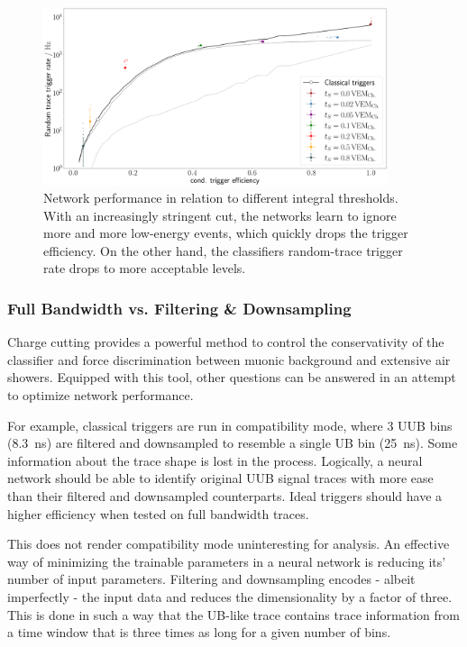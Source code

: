 \begin{figure}
	\centering
	\includegraphics[width=0.9\textwidth]{./plots/CNN_charge_cut.png}
	\caption{Network performance in relation to different integral thresholds. With an increasingly stringent cut, the networks learn to ignore more and more
	low-energy events, which quickly drops the trigger efficiency. On the other hand, the classifiers random-trace trigger rate drops to more acceptable levels.}
	\label{fig:CNN-charge-cut}
\end{figure}

\subsubsection{Full Bandwidth vs. Filtering \& Downsampling}
\label{sssec:full-bandwidth-filtering-downsampling}

Charge cutting provides a powerful method to control the conservativity of the classifier and force discrimination between muonic background and extensive air 
showers. Equipped with this tool, other questions can be answered in an attempt to optimize network performance.

For example, classical triggers are run in compatibility mode, where 3 UUB bins (\SI{8.3}{\nano\second}) are filtered and downsampled to resemble a single UB bin 
(\SI{25}{\nano\second}). Some information about the trace shape is lost in the process. Logically, a neural network should be able to identify original UUB signal 
traces with more ease than their filtered and downsampled counterparts. Ideal triggers should have a higher efficiency when tested on full bandwidth traces.

This does not render compatibility mode uninteresting for analysis. An effective way of minimizing the trainable parameters in a neural network is reducing its' 
number of input parameters. Filtering and downsampling encodes - albeit imperfectly - the input data and reduces the dimensionality by a factor of three. This is
done in such a way that the UB-like trace contains trace information from a time window that is three times as long for a given number of bins.

